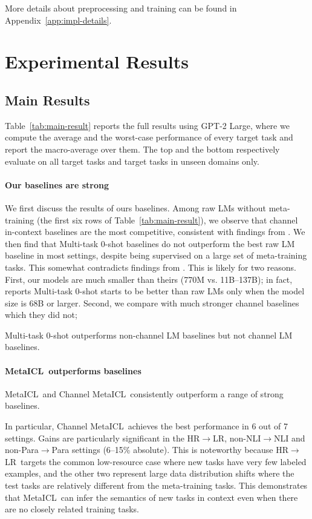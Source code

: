 More details about preprocessing and training can be found in Appendix~\ref{app:impl-details}.

\section{Experimental Results}\label{sec:exp-result}

\subsection{Main Results}\label{subsec:main-results}

Table~\ref{tab:main-result} reports the full results using GPT-2 Large, where we compute the average and the worst-case performance of every target task and report the macro-average over them. The top and the bottom respectively evaluate on all target tasks and target tasks in unseen domains only.

\paragraph{Our baselines are strong} We first discuss the results of ours baselines. Among raw LMs without meta-training (the first six rows of Table~\ref{tab:main-result}), we observe that channel in-context baselines are the most competitive, consistent with findings from \citet{min2022noisy}.
We then find that Multi-task 0-shot baselines do not outperform the best raw LM baseline in most settings, despite being supervised on a large set of meta-training tasks. This somewhat contradicts findings from \citet{wei2022finetuned,sanh2022multitask}.
This is likely for two reasons. First, our models are much smaller than theirs (770M vs. 11B--137B); in fact, \citet{wei2022finetuned} reports Multi-task 0-shot starts to be better than raw LMs only when the model size is 68B or larger. Second, we compare with much stronger channel baselines which they did not;

Multi-task 0-shot outperforms non-channel LM baselines but not channel LM baselines.

\paragraph{MetaICL\ outperforms baselines}
MetaICL\ and Channel MetaICL\ consistently outperform a range of strong baselines.

In particular, Channel MetaICL\ achieves the best performance in 6 out of 7 settings. Gains are particularly significant in the HR$\rightarrow$LR, non-NLI$\rightarrow$NLI and non-Para$\rightarrow$Para settings (6--15\% absolute). This is noteworthy because HR$\rightarrow$LR\ targets the common low-resource case where new tasks have very few labeled examples, and the other two represent large data distribution shifts where the test tasks are relatively different from the meta-training tasks. This demonstrates that MetaICL\ can infer the semantics of new tasks in context even when there are no closely related training tasks.


